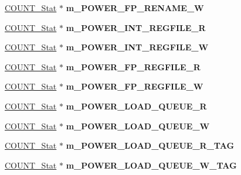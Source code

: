 \begin{DoxyCompactItemize}
\item 
\hypertarget{classall__stats__c_a17fd779d28ece64b840a574131c983af}{
\hyperlink{classCOUNT__Stat}{COUNT\_\-Stat} $\ast$ {\bfseries m\_\-POWER\_\-FP\_\-RENAME\_\-W}}
\label{classall__stats__c_a17fd779d28ece64b840a574131c983af}

\item 
\hypertarget{classall__stats__c_a422215eef2aaf089c09e0a6aa03ed97a}{
\hyperlink{classCOUNT__Stat}{COUNT\_\-Stat} $\ast$ {\bfseries m\_\-POWER\_\-INT\_\-REGFILE\_\-R}}
\label{classall__stats__c_a422215eef2aaf089c09e0a6aa03ed97a}

\item 
\hypertarget{classall__stats__c_a21e869c59ad3e8366b5b39ae7a1bd3fe}{
\hyperlink{classCOUNT__Stat}{COUNT\_\-Stat} $\ast$ {\bfseries m\_\-POWER\_\-INT\_\-REGFILE\_\-W}}
\label{classall__stats__c_a21e869c59ad3e8366b5b39ae7a1bd3fe}

\item 
\hypertarget{classall__stats__c_a916435e251015b709148e1db1ac9b0c5}{
\hyperlink{classCOUNT__Stat}{COUNT\_\-Stat} $\ast$ {\bfseries m\_\-POWER\_\-FP\_\-REGFILE\_\-R}}
\label{classall__stats__c_a916435e251015b709148e1db1ac9b0c5}

\item 
\hypertarget{classall__stats__c_ad38c262e39b63684c17435a638259714}{
\hyperlink{classCOUNT__Stat}{COUNT\_\-Stat} $\ast$ {\bfseries m\_\-POWER\_\-FP\_\-REGFILE\_\-W}}
\label{classall__stats__c_ad38c262e39b63684c17435a638259714}

\item 
\hypertarget{classall__stats__c_a1d286f409e55541fbb67182a8893a12b}{
\hyperlink{classCOUNT__Stat}{COUNT\_\-Stat} $\ast$ {\bfseries m\_\-POWER\_\-LOAD\_\-QUEUE\_\-R}}
\label{classall__stats__c_a1d286f409e55541fbb67182a8893a12b}

\item 
\hypertarget{classall__stats__c_a748e9a5e1b544fe4f088c9783a4925b6}{
\hyperlink{classCOUNT__Stat}{COUNT\_\-Stat} $\ast$ {\bfseries m\_\-POWER\_\-LOAD\_\-QUEUE\_\-W}}
\label{classall__stats__c_a748e9a5e1b544fe4f088c9783a4925b6}

\item 
\hypertarget{classall__stats__c_a982e3915fba9165651c9cef9265d9dfc}{
\hyperlink{classCOUNT__Stat}{COUNT\_\-Stat} $\ast$ {\bfseries m\_\-POWER\_\-LOAD\_\-QUEUE\_\-R\_\-TAG}}
\label{classall__stats__c_a982e3915fba9165651c9cef9265d9dfc}

\item 
\hypertarget{classall__stats__c_a4865bcbcb69c0f511fa9105f5f74bd7d}{
\hyperlink{classCOUNT__Stat}{COUNT\_\-Stat} $\ast$ {\bfseries m\_\-POWER\_\-LOAD\_\-QUEUE\_\-W\_\-TAG}}
\label{classall__stats__c_a4865bcbcb69c0f511fa9105f5f74bd7d}


\end{DoxyCompactItemize}
